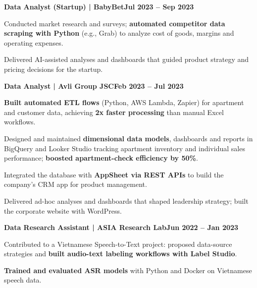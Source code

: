 \documentclass[letterpaper,10pt]{article}
\newcommand{\heading}[2]{
  \hspace{10pt}#1\hfill#2\\
}
\newcommand{\headingBf}[2]{
  \heading{\textbf{#1}}{\textbf{#2}}
}
\newenvironment{resume_list}{
  \vspace{-2pt}
  \begin{itemize}[topsep=2pt, itemsep=2pt, parsep=0pt, leftmargin=30pt, label=\textbullet]
}{
  \end{itemize}
}
\begin{document}
\vspace{10pt}

\headingBf{Data Analyst (Startup) | BabyBet}{Jul 2023 -- Sep 2023}
\vspace{3pt}
\begin{resume_list}
  \item Conducted market research and surveys; \textbf{automated competitor data scraping with Python} (e.g., Grab) to analyze cost of goods, margins and operating expenses.
  \item Delivered AI-assisted analyses and dashboards that guided product strategy and pricing decisions for the startup.
\end{resume_list}

\vspace{10pt}

\headingBf{Data Analyst | Avli Group JSC}{Feb 2023 -- Jul 2023}
\vspace{3pt}
\begin{resume_list}
  \item \textbf{Built automated ETL flows} (Python, AWS Lambda, Zapier) for apartment and customer data, achieving \textbf{2x faster processing} than manual Excel workflows.
  \item Designed and maintained \textbf{dimensional data models}, dashboards and reports in BigQuery and Looker Studio tracking apartment inventory and individual sales performance; \textbf{boosted apartment-check efficiency by 50\%}.
  \item Integrated the database with \textbf{AppSheet via REST APIs} to build the company's CRM app for product management.
  \item Delivered ad-hoc analyses and dashboards that shaped leadership strategy; built the corporate website with WordPress.
\end{resume_list}

\vspace{10pt}

\headingBf{Data Research Assistant | ASIA Research Lab}{Jun 2022 -- Jan 2023}
\vspace{3pt}
\begin{resume_list}
  \item Contributed to a Vietnamese Speech-to-Text project: proposed data-source strategies and \textbf{built audio-text labeling workflows with Label Studio}.
  \item \textbf{Trained and evaluated ASR models} with Python and Docker on Vietnamese speech data.
\end{resume_list}
\end{document}
